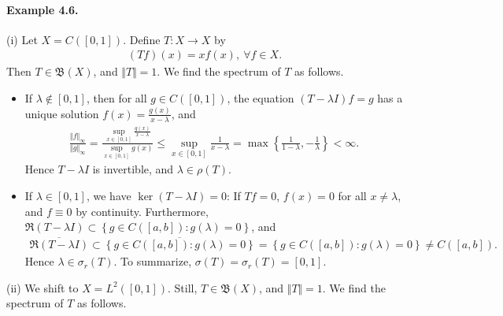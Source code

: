 \documentclass{article}
\begin{document}
\paragraph{Example 4.6.\label{example:4.6}} (i) Let $X=C([0,1])$. Define $T:X\to X$ by
\begin{align*}
	(Tf)(x) = xf(x),\ \forall f\in X.
\end{align*}
Then $T\in\mathfrak{B}(X)$, and $\Vert T\Vert=1$. We find the spectrum of $T$ as follows.
\begin{itemize}
\vspace{0.1cm}
\item If $\lambda\notin [0,1]$, then for all $g\in C([0,1])$, the equation $(T-\lambda I)f=g$ has a unique solution $f(x)=\frac{g(x)}{x-\lambda}$, and
\begin{align*}
	\frac{\Vert f\Vert_\infty}{\Vert g\Vert_\infty} = \frac{\sup_{x\in[0,1]}\frac{g(x)}{x-\lambda}}{\sup_{x\in[0,1]} g(x)} \leq\sup_{x\in[0,1]}\frac{1}{x-\lambda} = \max\left\{\frac{1}{1-\lambda},-\frac{1}{\lambda}\right\}< \infty.
\end{align*}
Hence $T-\lambda I$ is invertible, and $\lambda\in\rho(T)$.
\vspace{0.1cm}
\item If $\lambda\in [0,1]$, we have $\ker(T-\lambda I)=0$: If $Tf=0$, $f(x)=0$ for all $x\neq\lambda$, and $f\equiv 0$ by continuity. Furthermore, $\mathfrak{R}(T-\lambda I)\subset\left\{g\in C([a,b]): g(\lambda)=0\right\}$, and
\begin{align*}
	\overline{\mathfrak{R}(T-\lambda I)}\subset\overline{\left\{g\in C([a,b]): g(\lambda)=0\right\}} = \left\{g\in C([a,b]): g(\lambda)=0\right\}\neq C([a,b]).
\end{align*}
Hence $\lambda\in\sigma_r(T)$. To summarize, $\sigma(T)=\sigma_r(T)=[0,1]$. \vspace{0.2cm}
\end{itemize}
(ii) We shift to $X=L^2([0,1])$. Still, $T\in\mathfrak{B}(X)$, and $\Vert T\Vert=1$. We find the spectrum of $T$ as follows.
\end{document}
